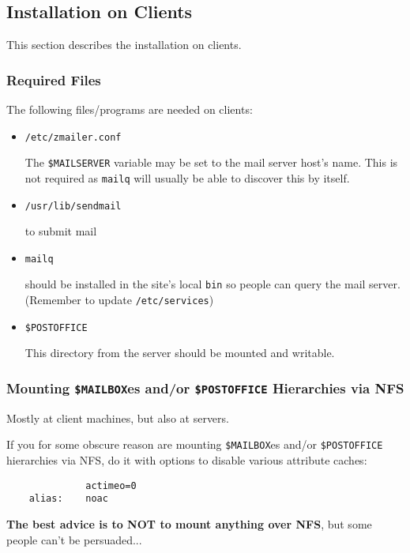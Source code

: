 \subsection{Installation on Clients}

This section describes the installation on clients.


\subsubsection{Required Files}

The following files/programs are needed on clients:
\begin{itemize}
\item {\tt /etc/zmailer.conf}

The {\tt \$MAILSERVER} variable may be set to the mail server host's name.
This is not required as {\tt mailq} will usually be able to discover this
by itself.

\vspace{1pt}
\item {\tt /usr/lib/sendmail}

to submit mail

\vspace{1pt}
\item {\tt mailq}

should be installed in the site's local {\tt bin} so people
can query the mail server. (Remember to update {\tt /etc/services})

\vspace{1pt}
\item {\tt \$POSTOFFICE}

This directory from the server should be mounted and writable.
\end{itemize}


\subsubsection{Mounting {\tt \$MAILBOX}es and/or {\tt \$POSTOFFICE} Hierarchies via NFS}

Mostly at client machines, but also at servers.

If you for some obscure reason are mounting {\tt \$MAILBOX}es
and/or {\tt \$POSTOFFICE} hierarchies via NFS, do it with
options to disable various attribute caches:
\begin{verbatim}
              actimeo=0
    alias:    noac
\end{verbatim}

{\bf The best advice is to NOT to mount anything over NFS},
but some people can't be persuaded...

